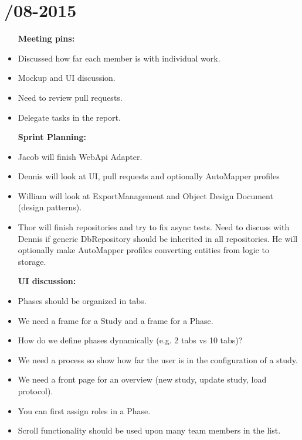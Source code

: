 \section{/08-2015} %
\attend{\at}{\at}{\at}{\at}


\begin{itemize}
	\item [\textbf{Meeting pins:}]
	\item Discussed how far each member is with individual work.
	\item Mockup and UI discussion. 
	\item Need to review pull requests. 
	\item Delegate tasks in the report. 
\end{itemize}

\begin{itemize}
	\item [\textbf{Sprint Planning:}]
	\item Jacob will finish WebApi Adapter.
	\item Dennis will look at UI, pull requests and optionally AutoMapper profiles
	\item William will look at ExportManagement and Object Design Document (design patterns).
	\item Thor will finish repositories and try to fix async tests. Need to discuss with Dennis if generic DbRepository should be inherited in all repositories. He will optionally make AutoMapper profiles converting entities from logic to storage.  
\end{itemize}

\begin{itemize}
	\item [\textbf{UI discussion:}]
	\item Phases should be organized in tabs.
	\item We need a frame for a Study and a frame for a Phase.
	\item How do we define phases dynamically (e.g. 2 tabs vs 10 tabs)?
	\item We need a process so show how far the user is in the configuration of a study.
	\item We need a front page for an overview (new study, update study, load protocol).
	\item You can first assign roles in a Phase. 
	\item Scroll functionality should be used upon many team members in the list. 
\end{itemize}
